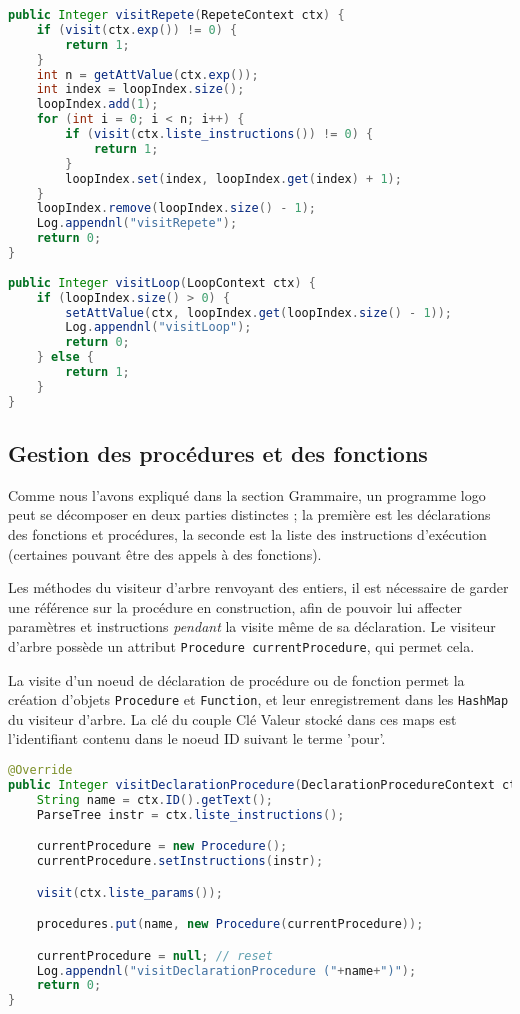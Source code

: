 \documentclass[a4paper,11pt]{article}
\begin{document}
\begin{lstlisting}[language=Java]
public Integer visitRepete(RepeteContext ctx) {
    if (visit(ctx.exp()) != 0) {
        return 1;
    }
    int n = getAttValue(ctx.exp());
    int index = loopIndex.size();
    loopIndex.add(1);
    for (int i = 0; i < n; i++) {
        if (visit(ctx.liste_instructions()) != 0) {
            return 1;
        }
        loopIndex.set(index, loopIndex.get(index) + 1);
    }
    loopIndex.remove(loopIndex.size() - 1);
    Log.appendnl("visitRepete");
    return 0;
}
    
public Integer visitLoop(LoopContext ctx) {
    if (loopIndex.size() > 0) {
        setAttValue(ctx, loopIndex.get(loopIndex.size() - 1));
        Log.appendnl("visitLoop");
        return 0;
    } else {
        return 1;
    }
}
\end{lstlisting}

\subsection{Gestion des procédures et des fonctions}
Comme nous l'avons expliqué dans la section Grammaire, un programme logo peut se décomposer en deux parties distinctes ; la première est les déclarations des fonctions et procédures, la seconde est la liste des instructions d'exécution (certaines pouvant être des appels à des fonctions).

Les méthodes du visiteur d'arbre renvoyant des entiers, il est nécessaire de garder une référence sur la procédure en construction, afin de pouvoir lui affecter paramètres et instructions \textit{pendant} la visite même de sa déclaration. Le visiteur d'arbre possède un attribut \lstinline$Procedure currentProcedure$, qui permet cela.

La visite d'un noeud de déclaration de procédure ou de fonction permet la création d'objets \lstinline$Procedure$ et \lstinline$Function$, et leur enregistrement dans les \lstinline$HashMap$ du visiteur d'arbre. La clé du couple Clé Valeur stocké dans ces maps est l'identifiant contenu dans le noeud ID suivant le terme 'pour'.

\begin{lstlisting}[language=Java]
@Override
public Integer visitDeclarationProcedure(DeclarationProcedureContext ctx) {
    String name = ctx.ID().getText();
    ParseTree instr = ctx.liste_instructions();

    currentProcedure = new Procedure();
    currentProcedure.setInstructions(instr);

    visit(ctx.liste_params());

    procedures.put(name, new Procedure(currentProcedure));

    currentProcedure = null; // reset
    Log.appendnl("visitDeclarationProcedure ("+name+")");
    return 0;
}
\end{lstlisting}
\end{document}
